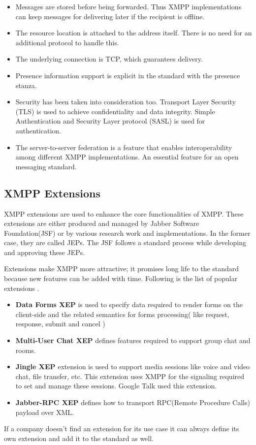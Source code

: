 \documentclass[12pt, conference, a4paper]{article}
\begin{document}
\begin{itemize}
    \item Messages are stored before being forwarded. Thus XMPP implementations can keep messages for delivering later if the recipient is offline.
    \item The resource location is attached to the address itself. There is no need for an additional protocol to handle this.
    \item The underlying connection is TCP, which guarantees delivery.
    \item Presence information support is explicit in the standard with the presence stanza.
    \item Security has been taken into consideration too. Transport Layer Security (TLS) is used to achieve confidentiality and data integrity. Simple Authentication and Security Layer protocol (SASL) is used for authentication.
    \item The server-to-server federation is a feature that enables interoperability among different XMPP implementations. An essential feature for an open messaging standard.
\end{itemize}

\subsection{XMPP Extensions}
XMPP extensions are used to enhance the core functionalities of XMPP. These extensions are either produced and managed by Jabber Software Foundation(JSF) or by various research work and implementations. In the former case, they are called JEPs. The JSF follows a standard process while developing and approving these JEPs.
\par
Extensions make XMPP more attractive; it promises long life to the standard because new features can be added with time. Following is the list of popular extensions \cite{xmppEXT}.
\begin{itemize}
\item \textbf{Data Forms XEP} is used to specify data required to render forms on the client-side and the related semantics for forms processing( like request, response, submit and cancel )
\item \textbf{Multi-User Chat XEP} defines features required to support group chat and rooms. 
\item \textbf{Jingle XEP} extension is used to support media sessions like voice and video chat, file transfer, etc. This extension uses XMPP for the signaling required to set and manage these sessions. Google Talk used this extension. 
\item \textbf{Jabber-RPC XEP} defines how to transport RPC(Remote Procedure Calls) payload over XML. 
\end{itemize}
If a company doesn’t find an extension for its use case it can always define its own extension and add it to the standard as well. 
\end{document}
